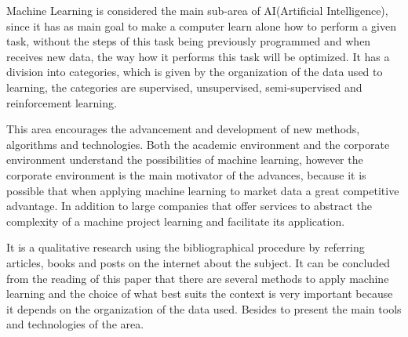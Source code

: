 Machine Learning is considered the main sub-area of AI(Artificial Intelligence), since it has as main goal to make a 
computer learn alone how to perform a given task, without the steps of this task being previously programmed
and when receives new data, the way how it performs this task will be optimized. 
It has a division into categories, which is given by the organization of the data used to learning, the categories are
supervised, unsupervised, semi-supervised and reinforcement learning. 


This area encourages the advancement and development of new methods, algorithms and technologies. Both the academic environment 
and the corporate environment understand the possibilities of machine learning, however the corporate environment is 
the main motivator of the advances, because it is possible that when applying machine learning to market data a 
great competitive advantage. In addition to large companies that offer services to abstract the complexity of a 
machine project learning and facilitate its application.


It is a qualitative research using the bibliographical procedure by referring articles, books and posts on the internet
about the subject. It can be concluded from the reading of this paper that there are several
methods to apply machine learning and the choice of what best suits the context is very important because it depends on the 
organization of the data used. Besides to present the main tools and technologies of the area.

